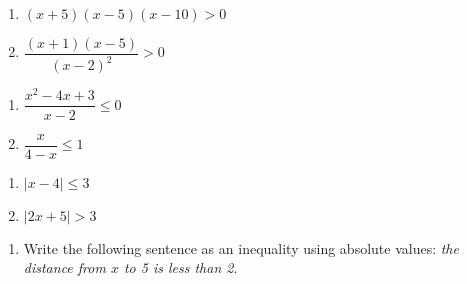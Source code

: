 \documentclass[10pt]{article}
\newcommand{\ds}{\displaystyle}
\begin{document}
\begin{multicols}{2}
\begin{enumerate}
\setcounter{enumi}{\theenumCount}
\item $(x+5)(x-5)(x-10) > 0$ 
\item $\dfrac{(x+1)(x-5)}{(x-2)^2} > 0$
\setcounter{enumCount}{\theenumi}
\end{enumerate}
\end{multicols}
\vfill


\newpage
\begin{multicols}{2}
\begin{enumerate}
\setcounter{enumi}{\theenumCount}
\item $\dfrac{x^2-4x+3}{x-2} \le 0$
\item $\dfrac{x}{4-x} \le 1$ 
\setcounter{enumCount}{\theenumi}
\end{enumerate}
\end{multicols}
\vfill


\begin{multicols}{2}
\begin{enumerate}
\setcounter{enumi}{\theenumCount}
\item $|x-4| \le 3$
\item $|2x+5| > 3$ 
\setcounter{enumCount}{\theenumi}
\end{enumerate}
\end{multicols}
\vfill

\begin{enumerate}
\setcounter{enumi}{\theenumCount}
\item Write the following sentence as an inequality using absolute values: \textit{the distance from $x$ to 5 is less than 2}. 
\setcounter{enumCount}{\theenumi}
\end{enumerate}
\vfill
\end{document}
